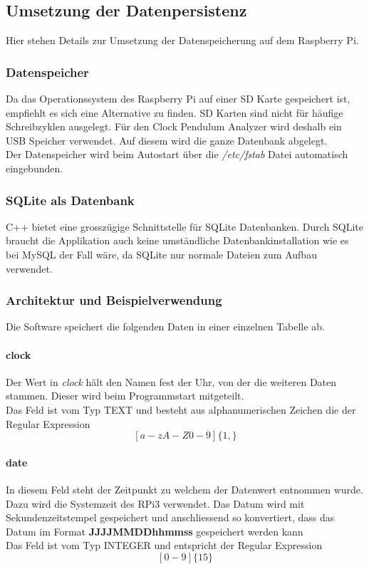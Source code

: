 \subsection{Umsetzung der Datenpersistenz}
    Hier stehen Details zur Umsetzung der Datenspeicherung auf dem Raspberry Pi.
    \subsubsection{Datenspeicher}
    Da das Operationssystem des Raspberry Pi auf einer SD Karte gespeichert ist, empfiehlt es sich eine Alternative zu finden. SD Karten sind nicht für häufige Schreibzyklen ausgelegt. Für den Clock Pendulum Analyzer wird deshalb ein USB Speicher verwendet. Auf diesem wird die ganze Datenbank abgelegt.\\
    Der Datenspeicher wird beim Autostart über die \textit{/etc/fstab} Datei automatisch eingebunden.
    
    \subsubsection{SQLite als Datenbank}
    C++ bietet eine grosszügige Schnittstelle für SQLite Datenbanken. Durch SQLite braucht die Applikation auch keine umständliche Datenbankinstallation wie es bei MySQL der Fall wäre, da SQLite nur normale Dateien zum Aufbau verwendet.
    
    \subsubsection{Architektur und Beispielverwendung}
    Die Software speichert die folgenden Daten in einer einzelnen Tabelle ab.
    \paragraph{clock}
    Der Wert in \textit{clock} hält den Namen fest der Uhr, von der die weiteren Daten stammen. Dieser wird beim Programmstart mitgeteilt.\\
    Das Feld ist vom Typ TEXT und besteht aus alphanumerischen Zeichen die der Regular Expression $$[a-zA-Z0-9]\{1,\}$$
    \paragraph{date}
    In diesem Feld steht der Zeitpunkt zu welchem der Datenwert entnommen wurde. Dazu wird die Systemzeit des RPi3 verwendet. Das Datum wird mit Sekundenzeitstempel gespeichert und anschliessend so konvertiert, dass das Datum im Format \textbf{JJJJMMDDhhmmss} gespeichert werden kann\\
    Das Feld ist vom Typ INTEGER und entspricht der Regular Expression
    $$[0-9]\{15\}$$
